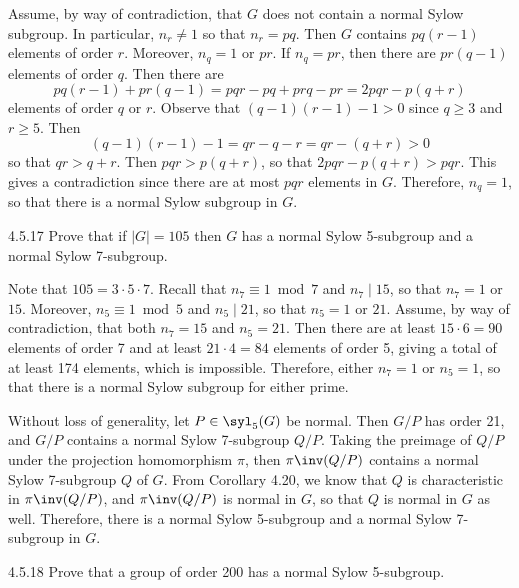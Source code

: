 \begin{sol}
	Assume, by way of contradiction, that $G$ does not contain a normal Sylow subgroup.
	In particular, $n_r \neq 1$ so that $n_r = pq$.
	Then $G$ contains $pq(r - 1)$ elements of order $r$.
	Moreover, $n_q = 1$ or $pr$.
	If $n_q = pr$, then there are $pr(q - 1)$ elements of order $q$.
	Then there are 
	\[
		pq(r - 1) + pr(q - 1) = pqr - pq + prq - pr = 2pqr - p(q + r)
	\]
	elements of order $q$ or $r$.
	Observe that $(q - 1)(r - 1) - 1 > 0$ since $q \geq 3$ and $r \geq 5$.
	Then
	\[
		(q - 1)(r - 1) - 1 = qr - q - r = qr - (q + r) > 0
	\]
	so that $qr > q + r$.
	Then $pqr > p(q + r)$, so that $2pqr - p(q + r) > pqr$.
	This gives a contradiction since there are at most $pqr$ elements in $G$.
	Therefore, $n_q = 1$, so that there is a normal Sylow subgroup in $G$.
\end{sol}

\begin{exercise}{4.5.17}
	Prove that if $|G| = 105$ then $G$ has a normal Sylow 5-subgroup and a normal Sylow 7-subgroup.
\end{exercise}

\begin{sol}
	Note that $105 = 3 \cdot 5 \cdot 7$.
	Recall that $n_7 \equiv 1 \bmod 7$ and $n_7 \mid 15$, so that $n_7 = 1$ or $15$.
	Moreover, $n_5 \equiv 1 \bmod 5$ and $n_5 \mid 21$, so that $n_5 = 1$ or $21$.
	Assume, by way of contradiction, that both $n_7 = 15$ and $n_5 = 21$.
	Then there are at least $15 \cdot 6 = 90$ elements of order 7 and at least $21 \cdot 4 = 84$ elements of order 5, giving a total of at least 174 elements, which is impossible.
	Therefore, either $n_7 = 1$ or $n_5 = 1$, so that there is a normal Sylow subgroup for either prime.

	Without loss of generality, let $P \in \syl_5(G)$ be normal.
	Then $G/P$ has order 21, and $G/P$ contains a normal Sylow 7-subgroup $Q/P$.
	Taking the preimage of $Q/P$ under the projection homomorphism $\pi$, then $\pi\inv(Q/P)$ contains a normal Sylow 7-subgroup $Q$ of $G$.
	From Corollary 4.20, we know that $Q$ is characteristic in $\pi\inv(Q/P)$, and $\pi\inv(Q/P)$ is normal in $G$, so that $Q$ is normal in $G$ as well.
	Therefore, there is a normal Sylow 5-subgroup and a normal Sylow 7-subgroup in $G$.
\end{sol}

\begin{exercise}{4.5.18}
	Prove that a group of order 200 has a normal Sylow 5-subgroup.
\end{exercise}

